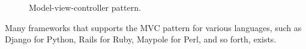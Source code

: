 \begin{figure}[H]
     \caption{\label{fig:mvc-pattern} Model-view-controller pattern.}
\end{figure}

Many frameworks that supports the MVC pattern for various languages, such as Django for Python, Rails for Ruby, Maypole for Perl, and so forth, exists.  